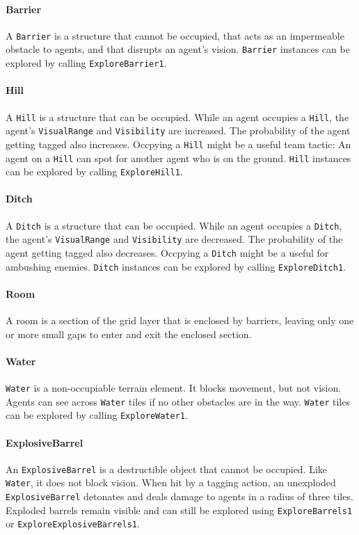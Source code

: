 \documentclass[a4paper,english,DIV=16,11pt,parskip=half,dvipsnames,listof=totoc,index=totoc,bibliography=totoc]{scrartcl}
\begin{document}
\paragraph{Barrier} \label{par:barrierDesc}
A \texttt{Barrier} is a structure that cannot be occupied, that acts as an impermeable obstacle to agents, and that disrupts an agent's vision. \texttt{Barrier} instances can be explored by calling \texttt{ExploreBarrier1}.
%
\paragraph{Hill} \label{par:hillDesc}
A \texttt{Hill} is a structure that can be occupied. While an agent occupies a \texttt{Hill}, the agent's \texttt{VisualRange} and \texttt{Visibility} are increased. The probability of the agent getting tagged also increases. Occpying a \texttt{Hill} might be a useful team tactic: An agent on a \texttt{Hill} can spot for another agent who is on the ground. \texttt{Hill} instances can be explored by calling \texttt{ExploreHill1}.
%
\paragraph{Ditch} \label{par:ditchDesc}
A \texttt{Ditch} is a structure that can be occupied. While an agent occupies a \texttt{Ditch}, the agent's \texttt{VisualRange} and \texttt{Visibility} are decreased. The probability of the agent getting tagged also decreases. Occpying a \texttt{Ditch} might be a useful for ambushing enemies. \texttt{Ditch} instances can be explored by calling \texttt{ExploreDitch1}.
%
\paragraph{Room} \label{par:roomDesc}
A room is a section of the grid layer that is enclosed by barriers, leaving only one or more small gaps to enter and exit the enclosed section.
%
\paragraph{Water} \label{par:waterDesc}
\texttt{Water} is a non-occupiable terrain element. It blocks movement, but not vision. Agents can see across \texttt{Water} tiles if no other obstacles are in the way. \texttt{Water} tiles can be explored by calling \texttt{ExploreWater1}.
%
\paragraph{ExplosiveBarrel} \label{par:barrelDesc}
An \texttt{ExplosiveBarrel} is a destructible object that cannot be occupied. Like \texttt{Water}, it does not block vision. When hit by a tagging action, an unexploded \texttt{ExplosiveBarrel} detonates and deals damage to agents in a radius of three tiles. Exploded barrels remain visible and can still be explored using \texttt{ExploreBarrels1} or \texttt{ExploreExplosiveBarrels1}.
\end{document}
